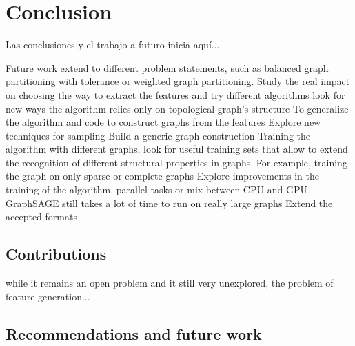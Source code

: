 
\chapter{Conclusion}

Las conclusiones y el trabajo a futuro inicia aqu\'i...

Future work
extend to different problem statements, such as balanced graph partitioning with tolerance or weighted graph partitioning.
Study the real impact on choosing the way to extract the features and try different algorithms
look for new ways the algorithm relies only on topological graph's structure
To generalize the algorithm and code to construct graphs from the features
Explore new techniques for sampling
Build a generic graph construction
Training the algorithm with different graphs, look for useful training sets that allow to extend the recognition of different structural properties in graphs. For example, training the graph on only sparse or complete graphs
Explore improvements in the training of the algorithm, parallel tasks or mix between CPU and GPU
GraphSAGE still takes a lot of time to run on really large graphs
Extend the accepted formats 
\section{Contributions}
while it remains an open problem and it still very unexplored, the problem of feature generation...
\section{Recommendations and future work}

\clearpage